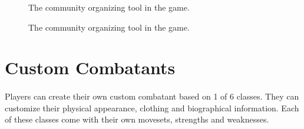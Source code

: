 \pagebreak

\begin{figure}[h!]
    \centering
    \caption{The community organizing tool in the game.}
\end{figure}

\begin{figure}[h!]
    \centering
    \caption{The community organizing tool in the game.}
\end{figure}

\pagebreak

\section{Custom Combatants}

\paragraph{} Players can create their own custom combatant based on 1 of 6 classes. They can customize their physical appearance, clothing and biographical information. Each of these classes come with their own movesets, strengths and weaknesses.

